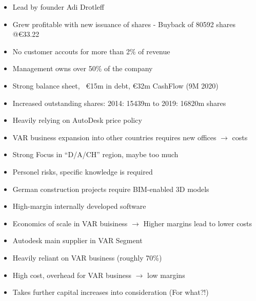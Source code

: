 \documentclass{company_analysis}
\begin{document}
\swot
    { %
    \begin{itemize}[leftmargin=*,noitemsep]
        \item Lead by founder Adi Drotleff
        \item Grew profitable with new issuance of shares - Buyback of \num{80592} shares @\euro\num{33,22}
        \item No customer accouts for more than 2\% of revenue
        \item Management owns  over 50\% of the company
        \item Strong balance sheet, ~\euro\num{15}m in debt, \euro\num{32}m CashFlow (9M 2020)
    \end{itemize}
    }
    { %
    \begin{itemize}[leftmargin=*, noitemsep]
        \item Increased outstanding shares: 2014: \num{15439}m to 2019: \num{16820}m shares
        \item Heavily relying on AutoDesk price policy
        \item VAR business expansion into other countries requires new offices $\rightarrow$ costs
        \item Strong Focus in \enquote{D/A/CH} region, maybe too much
        \item Personel risks, specific knowledge is required
    \end{itemize}
    }
    { %
    \begin{itemize}[leftmargin=*,noitemsep]
        \item German construction projects require BIM-enabled 3D models
        \item High-margin internally developed software
        \item Economics of scale in VAR buisiness $\rightarrow$ Higher margins lead to lower costs
    \end{itemize}
    }
    { %
    \begin{itemize}[leftmargin=*,noitemsep]
        \item Autodesk main supplier in VAR Segment
        \item Heavily reliant on VAR business (roughly \num{70}\%)
        \item High cost, overhead for VAR business $\rightarrow$ low margins
        \item Takes further capital increases into consideration (For what?!)
    \end{itemize}
    }
\end{document}
